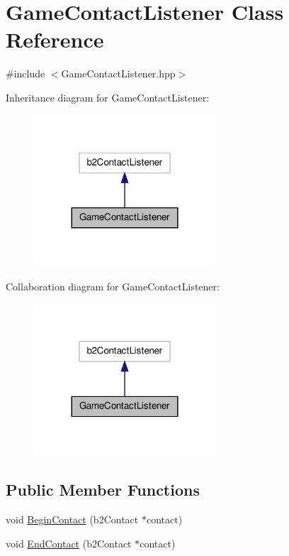 \hypertarget{class_game_contact_listener}{\section{Game\-Contact\-Listener Class Reference}
\label{class_game_contact_listener}
}


{\ttfamily \#include $<$Game\-Contact\-Listener.\-hpp$>$}



Inheritance diagram for Game\-Contact\-Listener\-:
\nopagebreak
\begin{figure}[H]
\begin{center}
\leavevmode
\includegraphics[width=192pt]{class_game_contact_listener__inherit__graph}
\end{center}
\end{figure}


Collaboration diagram for Game\-Contact\-Listener\-:
\nopagebreak
\begin{figure}[H]
\begin{center}
\leavevmode
\includegraphics[width=192pt]{class_game_contact_listener__coll__graph}
\end{center}
\end{figure}
\subsection*{Public Member Functions}
\begin{DoxyCompactItemize}
\item 
void \hyperlink{class_game_contact_listener_a3a66eddc0010a96f83a0cb61d3835cc7}{Begin\-Contact} (b2\-Contact $\ast$contact)
\item 
void \hyperlink{class_game_contact_listener_a2d754e57a4f6c88541853a506ec3b10d}{End\-Contact} (b2\-Contact $\ast$contact)
\end{DoxyCompactItemize}


